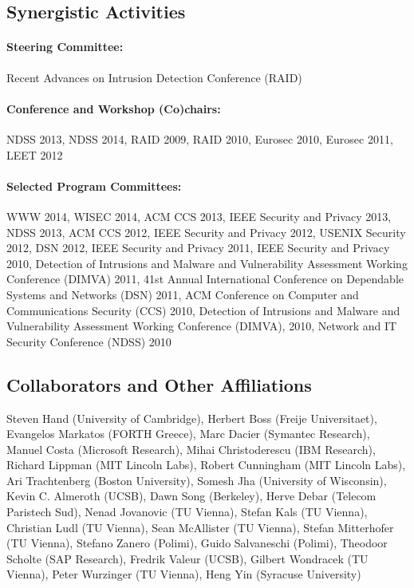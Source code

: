 \documentclass[letterpaper,twoside,11pt,headings=small]{scrartcl}
\begin{document}
\subsection*{Synergistic Activities}

\paragraph{Steering Committee:}
Recent Advances on Intrusion Detection Conference (RAID)

\paragraph{Conference and Workshop (Co)chairs:} NDSS 2013, NDSS 2014, RAID 2009, RAID 2010,
Eurosec 2010, Eurosec 2011, LEET 2012

\paragraph{Selected Program Committees:}
WWW 2014, WISEC 2014, ACM CCS 2013, IEEE Security and Privacy 2013,
NDSS 2013, ACM CCS 2012, IEEE Security and Privacy 2012, USENIX
Security 2012, DSN 2012, IEEE Security and Privacy 2011, IEEE Security
and Privacy 2010, Detection of Intrusions and Malware and
Vulnerability Assessment Working Conference (DIMVA) 2011, 41st Annual
International Conference on Dependable Systems and Networks (DSN)
2011, ACM Conference on Computer and Communications Security (CCS)
2010, Detection of Intrusions and Malware and Vulnerability Assessment
Working Conference (DIMVA), 2010, Network and IT Security Conference
(NDSS) 2010

\subsection*{Collaborators and Other Affiliations}

Steven Hand (University of Cambridge),
Herbert Boss (Freije Universitaet),
Evangelos Markatos (FORTH Greece),
Marc Dacier (Symantec Research),
Manuel Costa (Microsoft Research),
Mihai Christoderescu (IBM Research),
Richard Lippman (MIT Lincoln Labs),
Robert Cunningham (MIT Lincoln Labs),
Ari Trachtenberg (Boston University),
Somesh Jha (University of Wisconsin),
Kevin C. Almeroth (UCSB),
Dawn Song (Berkeley),
Herve Debar (Telecom Paristech Sud),
Nenad Jovanovic (TU Vienna),
Stefan Kals (TU Vienna),
Christian Ludl  (TU Vienna),
Sean McAllister (TU Vienna),
Stefan Mitterhofer (TU Vienna),
Stefano Zanero (Polimi),
Guido Salvaneschi (Polimi),
Theodoor Scholte (SAP Research),
Fredrik Valeur (UCSB),
Gilbert Wondracek (TU Vienna),
Peter Wurzinger (TU Vienna),
Heng Yin (Syracuse University)
\end{document}
